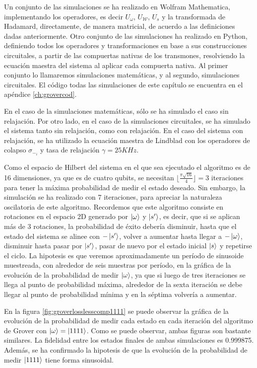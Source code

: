 Un conjunto de las simulaciones se ha realizado en Wolfram Mathematica, implementando los operadores, es decir $U_{\omega}$, $U_\mathcal{W}$, $U_s$ y la transformada de Hadamard, directamente, de manera matricial, de acuerdo a las definiciones dadas anteriormente. Otro conjunto de las simulaciones ha realizado en Python, definiendo todos los operadores y transformaciones en base a sus construcciones circuitales, a partir de las compuertas nativas de los transmones, resolviendo la ecuación maestra del sistema al aplicar cada compuerta nativa. Al primer conjunto lo llamaremos simulaciones matemáticas, y al segundo, simulaciones circuitales. El código todas las simulaciones de este capítulo se encuentra en el apéndice \ref{ch:grovercod}.

En el caso de la simulaciones matemáticas, sólo se ha simulado el caso sin relajación. Por otro lado, en el caso de la simulaciones circuitales, se ha simulado el sistema tanto sin relajación, como con relajación. En el caso del sistema con relajación, se ha utilizado la ecuación maestra de Lindblad con los operadores de colapso $\sigma_{-_i}$ y tasa de relajación $\gamma = 25KHz$.

Como el espacio de Hilbert del sistema en el que sea ejecutado el algoritmo es de 16 dimensiones, ya que es de cuatro qubits, se necesitan $\lfloor \frac{\pi \sqrt{16}}{4} \rfloor = 3$ iteraciones para tener la máxima probabilidad de medir el estado deseado. Sin embargo, la simulación se ha realizado con 7 iteraciones, para apreciar la naturaleza oscilatoria de este algoritmo. Recordemos que este algoritmo consiste en rotaciones en el espacio 2D generado por $\ket{\omega}$ y $\ket{s^\prime}$, es decir, que si se aplican más de 3 rotaciones, la probabilidad de éxito debería disminuir, hasta que el estado del sistema se alinee con $- \ket{s^\prime}$, volver a aumentar hasta llegar a $- \ket{\omega}$, disminuir hasta pasar por $\ket{s^\prime}$, pasar de nuevo por el estado inicial $\ket{s}$ y repetirse el ciclo. La hipotesis es que veremos aproximadamente un período de sinusoide muestreada, con alrededor de seis muestras por período, en la gráfica de la evolución de la probabilidad de medir $\ket{\omega}$, ya que si luego de tres iteraciones se llega al punto de probabilidad máxima, alrededor de la sexta iteración se debe llegar al punto de probabilidad mínima y en la séptima volvería a aumentar.

En la figura \ref{fig:groverlosslesscomp1111} se puede observar la gráfica de la evolución de la probabilidad de medir cada estado en cada iteración del algoritmo de Grover con $\ket{\omega} = \ket{1111}$. Como se puede observar, ambas figuras son bastante similares. La fidelidad entre los estados finales de ambas simulaciones es 0.999875. Además, se ha confirmado la hipotesis de que la evolución de la probabilidad de medir $\ket{1111}$ tiene forma sinusoidal.

